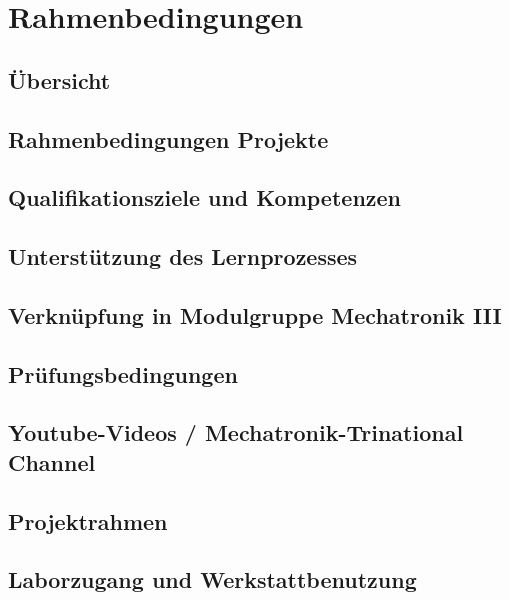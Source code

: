 \section*{Rahmenbedingungen}


\subsection*{Übersicht}


\subsection*{Rahmenbedingungen Projekte}


\subsection*{Qualifikationsziele und Kompetenzen}


\subsection*{Unterstützung des Lernprozesses}


\subsection*{Verknüpfung in Modulgruppe Mechatronik III}


\subsection*{Prüfungsbedingungen}


\subsection*{Youtube-Videos / Mechatronik-Trinational Channel}


\subsection*{Projektrahmen}


\subsection*{Laborzugang und Werkstattbenutzung}